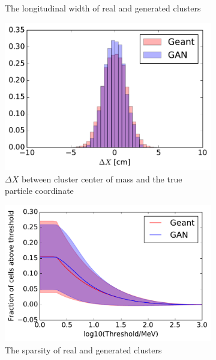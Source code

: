 \begin{figure}
\begin{subfigure}[t]{0.3\textwidth}
    \caption{The longitudinal width of real and generated clusters}
  \end{subfigure}
  \begin{subfigure}[t]{0.3\textwidth}
    \centering
    \includegraphics[width=1\textwidth]{figures/deltaX.pdf}
    \caption{$\Delta X$ between cluster center of mass and the true particle coordinate}
  \end{subfigure}\hspace{0.2\textwidth}
  \begin{subfigure}[t]{0.3\textwidth}
    \centering
    \includegraphics[width=1\textwidth]{figures/sparsity.pdf}
    \caption{The sparsity of real and generated clusters}
  \end{subfigure}
  \begin{subfigure}[t]{0.3\textwidth}
    \centering

\end{subfigure}
\end{figure}
